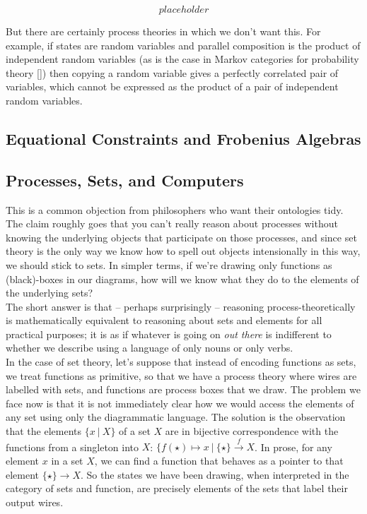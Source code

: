 \[placeholder\]

But there are certainly process theories in which we don't want this. For example, if states are random variables and parallel composition is the product of independent random variables (as is the case in Markov categories for probability theory []) then copying a random variable gives a perfectly correlated pair of variables, which cannot be expressed as the product of a pair of independent random variables.

\subsection{Equational Constraints and Frobenius Algebras}

\subsection{Processes, Sets, and Computers}


This is a common objection from philosophers who want their ontologies tidy. The claim roughly goes that you can't really reason about processes without knowing the underlying objects that participate on those processes, and since set theory is the only way we know how to spell out objects intensionally in this way, we should stick to sets. In simpler terms, if we're drawing only functions as (black)-boxes in our diagrams, how will we know what they do to the elements of the underlying sets?\\

The short answer is that -- perhaps surprisingly -- reasoning process-theoretically is mathematically equivalent to reasoning about sets and elements for all practical purposes; it is as if whatever is going on \emph{out there} is indifferent to whether we describe using a language of only nouns or only verbs.\\

In the case of set theory, let's suppose that instead of encoding functions as sets, we treat functions as primitive, so that we have a process theory where wires are labelled with sets, and functions are process boxes that we draw. The problem we face now is that it is not immediately clear how we would access the elements of any set using only the diagrammatic language. The solution is the observation that the elements $\{x \ | \ X\}$ of a set $X$ are in bijective correspondence with the functions from a singleton into $X$: $\{ f(\star) \mapsto x \ | \ \{\star\} \overset{f}{\rightarrow} X $. In prose, for any element $x$ in a set $X$, we can find a function that behaves as a pointer to that element $\{\star\} \rightarrow X$. So the states we have been drawing, when interpreted in the category of sets and function, are precisely elements of the sets that label their output wires.\\

